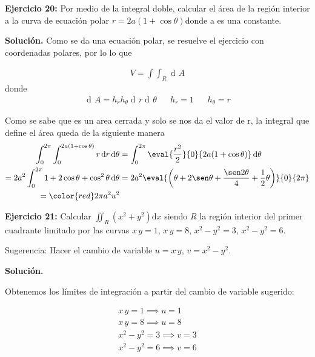 \documentclass[12pt]{article}
\DeclareMathOperator{\di}{d\!}
\begin{document}
\noindent \textbf{Ejercicio 20:} Por medio de la integral doble, calcular el área de la región interior a la curva de
ecuación polar $r = 2a(1 + \cos \theta)$donde a es una constante.

\vspace{5mm}

\noindent \textbf{Solución.}
\vspace{3mm}
Como se da una ecuación polar, se resuelve el ejercicio con coordenadas polares, por lo
lo que 

\begin{align*}
	V = \int\int_{R} \di A
\end{align*}
donde
\begin{align*}
	\di A = h_{r}h_{\theta} \di r \di \theta && h_{r}=1 && h_{\theta} = r
\end{align*} 

Como se sabe que es un area cerrada y solo se nos da el valor de r, la integral que define 
el área queda de la siguiente manera
\begin{align*}
	\int_0^{2\pi} \int_0^{2a(1+\cos\theta)} r \di r \di \theta 
	&= \int_0^{2\pi} \eval{\frac{r^2}{2}}{0}{2a(1 + \cos\theta)} \di \theta \\
	=2a^2 \int_0^{2\pi} 1 + 2 \cos\theta + \cos^2\theta \di \theta 
	&= 2a^2 \eval{\left(\theta + 2\sen \theta + \frac{\sen2\theta}{4}
	+ \frac{1}{2} \theta\right)}{0}{2\pi} \\
	= \color{red} 2\pi a^2 u^2  
\end{align*}

\noindent \textbf{Ejercicio 21:} Calcular $\iint_R (x^2 + y^2) \mathrm{d}x$ siendo $R$ la región interior del primer cuadrante limitado por las curvas $x\,y=1$, $x\,y=8$, $x^2-y^2=3$, $x^2-y^2=6$.

Sugerencia: Hacer el cambio de variable $u = x\,y$, $v=x^2-y^2$.

\vspace{5mm}

\noindent \textbf{Solución.}

\vspace{3mm}

\noindent Obtenemos los límites de integración a partir del cambio de variable sugerido:

\begin{gather*}
	x\,y=1 \implies u = 1 \\
	x\,y=8 \implies u = 8 \\
	x^2-y^2=3 \implies v = 3 \\
	x^2-y^2=6 \implies v = 6
\end{gather*}
\end{document}
